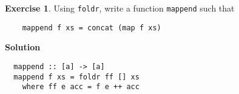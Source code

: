 \documentclass[11pt,a4paper]{article}
\theoremstyle{definition}
\newtheorem{exr}{Exercise}
\begin{document}
\vspace{5mm}

\begin{exr}
  Using \texttt{foldr}, write a function \texttt{mappend} such that

  \begin{lstlisting}
    mappend f xs = concat (map f xs)
  \end{lstlisting}
\end{exr}

\textbf{Solution}
\begin{lstlisting}
  mappend :: [a] -> [a]
  mappend f xs = foldr ff [] xs
    where ff e acc = f e ++ acc
\end{lstlisting}
\end{document}
